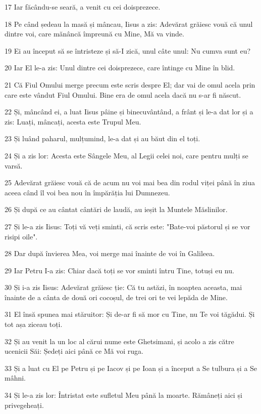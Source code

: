 \par 17 Iar făcându-se seară, a venit cu cei doisprezece.
\par 18 Pe când ședeau la masă și mâncau, Iisus a zis: Adevărat grăiesc vouă că unul dintre voi, care mănâncă împreună cu Mine, Mă va vinde.
\par 19 Ei au început să se întristeze și să-I zică, unul câte unul: Nu cumva sunt eu?
\par 20 Iar El le-a zis: Unul dintre cei doisprezece, care întinge cu Mine în blid.
\par 21 Că Fiul Omului merge precum este scris despre El; dar vai de omul acela prin care este vândut Fiul Omului. Bine era de omul acela dacă nu s-ar fi născut.
\par 22 Și, mâncând ei, a luat Iisus pâine și binecuvântând, a frânt și le-a dat lor și a zis: Luați, mâncați, acesta este Trupul Meu.
\par 23 Și luând paharul, mulțumind, le-a dat și au băut din el toți.
\par 24 Și a zis lor: Acesta este Sângele Meu, al Legii celei noi, care pentru mulți se varsă.
\par 25 Adevărat grăiesc vouă că de acum nu voi mai bea din rodul viței până în ziua aceea când îl voi bea nou în împărăția lui Dumnezeu.
\par 26 Și după ce au cântat cântări de laudă, au ieșit la Muntele Măslinilor.
\par 27 Și le-a zis Iisus: Toți vă veți sminti, că scris este: "Bate-voi păstorul și se vor risipi oile".
\par 28 Dar după învierea Mea, voi merge mai înainte de voi în Galileea.
\par 29 Iar Petru I-a zis: Chiar dacă toți se vor sminti întru Tine, totuși eu nu.
\par 30 Și i-a zis Iisus: Adevărat grăiesc ție: Că tu astăzi, în noaptea aceasta, mai înainte de a cânta de două ori cocoșul, de trei ori te vei lepăda de Mine.
\par 31 El însă spunea mai stăruitor: Și de-ar fi să mor cu Tine, nu Te voi tăgădui. Și tot așa ziceau toți.
\par 32 Și au venit la un loc al cărui nume este Ghetsimani, și acolo a zis către ucenicii Săi: Ședeți aici până ce Mă voi ruga.
\par 33 Și a luat cu El pe Petru și pe Iacov și pe Ioan și a început a Se tulbura și a Se mâhni.
\par 34 Și le-a zis lor: Întristat este sufletul Meu până la moarte. Rămâneți aici și privegeheați.
